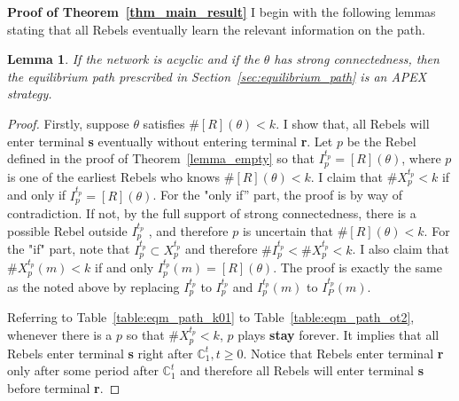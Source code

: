 \documentclass[12pt,letter]{article}
\newcommand{\Kappa}{\mathbb{C}}
\newtheorem{lemma}{Lemma}[section]
\theoremstyle{definition}
\theoremstyle{definition}
\theoremstyle{remark}
\theoremstyle{claim}
\begin{document}
\noindent\textbf{Proof of Theorem~\ref{thm_main_result}}
I begin with the following lemmas stating that all Rebels eventually learn the relevant information on the path.
\begin{lemma}
\label{lemma:learning_on_the_path}
If the network is acyclic and if the $\theta$ has strong connectedness, then the equilibrium path prescribed in Section~\ref{sec:equilibrium_path} is an APEX strategy.
\end{lemma}
\begin{proof}
Firstly, suppose $\theta$ satisfies $\#[R](\theta)<k$. I show that, all Rebels will enter terminal \textbf{s} eventually without entering terminal \textbf{r}.  Let $p$ be the Rebel defined in the proof of Theorem~\ref{lemma_empty} so that $I^{t_p}_p=[R](\theta)$, where $p$ is one of the earliest Rebels who knows $\#[R](\theta)<k$. I claim that $\#X^{t_p}_p< k$ if and only if $I^{t_p}_p=[R](\theta)$. For the "only if'' part, the proof is by way of contradiction. If not, by the full support of strong connectedness, there is a possible Rebel outside $I^{t_p}_p$ , and therefore $p$ is uncertain that $\#[R](\theta)<k$. For the "if" part, note that $I^{t_p}_p\subset X^{t_p}_p$ and therefore $\#I^{t_p}_p< \#X^{t_p}_p<k$. I also claim that $\#X^{t_p}_p(m)<k$ if and only $I^{t_p}_p(m)=[R](\theta)$. The proof is exactly the same as the noted above by replacing $I^{t_p}_p$ to $I^{t_p}_p$ and $I^{t_p}_p(m)$ to $I^{t_p}_P(m)$.

Referring to Table~\ref{table:eqm_path_k01} to Table~\ref{table:eqm_path_ot2}, whenever there is a $p$ so that $\#X^{t_p}_p<k$, $p$ plays \textbf{stay} forever. It implies that all Rebels enter terminal \textbf{s} right after $\Kappa^t_1, t\geq 0$. Notice that Rebels enter terminal \textbf{r} only after some period after $\Kappa^t_1$ and therefore all Rebels will enter terminal \textbf{s} before terminal \textbf{r}. 


\end{proof}
\end{document}
